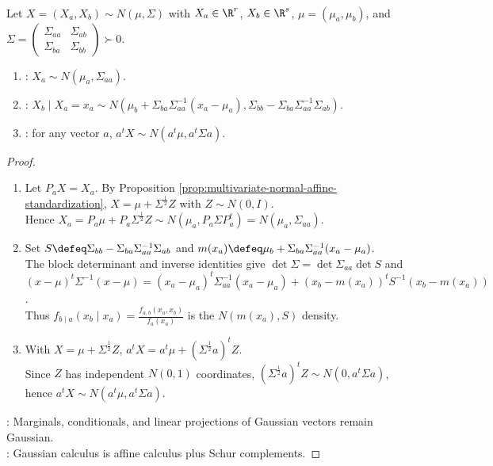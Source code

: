 \begin{proposition} \label{prop:multivariate-normal-basic-calculus} \\
Let $X=(X_a,X_b)\sim N(\mu,\Sigma)$ with $X_a\in\R^r$, $X_b\in\R^s$, $\mu=(\mu_a,\mu_b)$, and $\Sigma=\begin{pmatrix}\Sigma_{aa}&\Sigma_{ab}\\ \Sigma_{ba}&\Sigma_{bb}\end{pmatrix}\succ0$.
\begin{enumerate}[label=(\roman*)]
\setlength{\itemsep}{0pt}
\item {}: $X_a\sim N(\mu_a,\Sigma_{aa})$.
\item {}: $X_b\mid X_a=x_a\sim N(\mu_b+\Sigma_{ba}\Sigma_{aa}^{-1}(x_a-\mu_a),\Sigma_{bb}-\Sigma_{ba}\Sigma_{aa}^{-1}\Sigma_{ab})$.
\item {}: for any vector $a$, $a^tX\sim N(a^t\mu,a^t\Sigma a)$.
\end{enumerate}
\begin{proof}
\begin{enumerate}[label=(\roman*)]
\setlength{\itemsep}{0pt}
\item Let $P_aX=X_a$. By Proposition \ref{prop:multivariate-normal-affine-standardization}, $X=\mu+\Sigma^{\frac{1}{2}}Z$ with $Z\sim N(0,I)$.\\
Hence $X_a=P_a\mu+P_a\Sigma^{\frac{1}{2}}Z\sim N(\mu_a,P_a\Sigma P_a^t)=N(\mu_a,\Sigma_{aa})$.
\item Set $S\defeq\Sigma_{bb}-\Sigma_{ba}\Sigma_{aa}^{-1}\Sigma_{ab}$ and $m(x_a)\defeq\mu_b+\Sigma_{ba}\Sigma_{aa}^{-1}(x_a-\mu_a)$.\\
The block determinant and inverse identities give $\det\Sigma=\det\Sigma_{aa}\det S$ and\\
$(x-\mu)^t\Sigma^{-1}(x-\mu)=(x_a-\mu_a)^t\Sigma_{aa}^{-1}(x_a-\mu_a)+(x_b-m(x_a))^tS^{-1}(x_b-m(x_a))$.\\
Thus $f_{b\mid a}(x_b\mid x_a)=\frac{f_{a,b}(x_a,x_b)}{f_a(x_a)}$ is the $N(m(x_a),S)$ density.
\item With $X=\mu+\Sigma^{\frac{1}{2}}Z$, $a^tX=a^t\mu+(\Sigma^{\frac{1}{2}}a)^tZ$.\\
Since $Z$ has independent $N(0,1)$ coordinates, $(\Sigma^{\frac{1}{2}}a)^tZ\sim N(0,a^t\Sigma a)$, hence $a^tX\sim N(a^t\mu,a^t\Sigma a)$.
\end{enumerate}
: Marginals, conditionals, and linear projections of Gaussian vectors remain Gaussian.\\
: Gaussian calculus is affine calculus plus Schur complements.
\end{proof}
\end{proposition}

